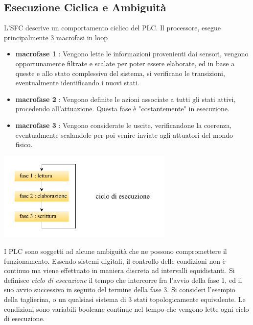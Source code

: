 \documentclass[10pt, letterpaper]{report}
\begin{document}
\subsection{Esecuzione Ciclica e Ambiguità}
L'SFC descrive un comportamento ciclico del PLC. Il processore, esegue principalmente 3 macrofasi in loop\begin{itemize}
    \item \textbf{macrofase 1} : Vengono lette le informazioni provenienti dai sensori, vengono opportunamente filtrate e scalate per poter essere elaborate, ed in base a queste e allo stato complessivo del sistema, si verificano le transizioni, eventualmente identificando i nuovi stati. 
    \item \textbf{macrofase 2} : Vengono definite le azioni associate a tutti gli stati attivi, procedendo all'attuazione. Questa fase è "costantemente" in esecuzione. 
    \item \textbf{macrofase 3} : Vengono considerate le uscite, verificandone la coerenza, eventualmente scalandole per poi venire inviate agli attuatori del mondo fisico.
\end{itemize}
\begin{center}
    \includegraphics[width=0.65\textwidth ]{images/fasiPLC.pdf}
\end{center}
I PLC sono soggetti ad alcune ambiguità che ne possono compromettere il funzionamento. Essendo sistemi digitali, il controllo delle condizioni non è continuo ma viene effettuato in maniera discreta ad intervalli equidistanti. Si definisce \textit{ciclo di esecuzione} il tempo che intercorre fra l'avvio della fase 1, ed il suo avvio successivo in seguito del termine della fase 3.\acc 
Si consideri l'esempio della taglierina, o un qualsiasi sistema di 3 stati topologicamente equivalente. Le condizioni sono variabili booleane continue nel tempo che vengono lette ogni ciclo di esecuzione.
\end{document}
